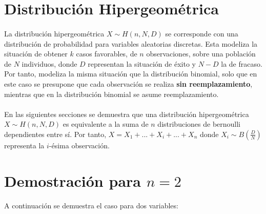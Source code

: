 \documentclass{article}
\begin{document}
	\maketitle
  \thispagestyle{empty}


  \section{Distribución Hipergeométrica}
  \label{sec:description}

    \paragraph{}
    La distribución hipergeométrica $X \sim H(n, N, D)$ se corresponde con una distribución de probabilidad para variables aleatorias discretas. Esta modeliza la situación de obtener $k$ casos favorables, de $n$ observaciones, sobre una población de $N$ individuos, donde $D$ representan la situación de éxito y $N-D$ la de fracaso. Por tanto, modeliza la misma situación que la distribución binomial, solo que en este caso se presupone que cada observación se realiza \textbf{sin reemplazamiento}, mientras que en la distribución binomial se asume reemplazamiento.

    \paragraph{}
    En las siguientes secciones se demuestra que una distribución hipergeométrica $X \sim H(n, N, D)$ es equivalente a la suma de $n$ distribuciones de bernoulli dependientes entre sí. Por tanto, $X = X_1 + ... + X_i + ... + X_n$ donde $X_i \sim B(\frac{D}{N})$ representa la $i$-ésima observación.

  \section{Demostración para $n=2$}
  \label{sec:demostration_1}

    \paragraph{}
    A continuación se demuestra el caso para dos variables:
\end{document}
